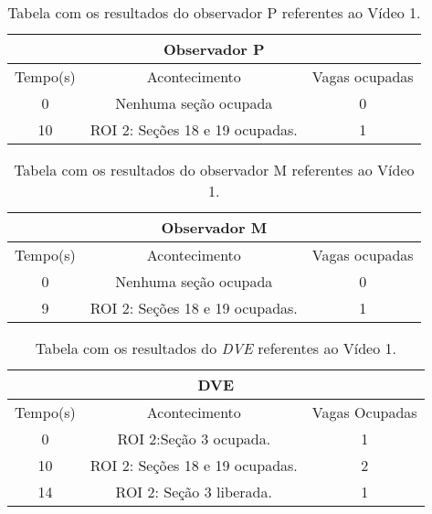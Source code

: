 \begin{table}[H]
\begin{center}
\begin{tabular}{|c||c||c|}
\hline
\multicolumn{3}{|c|}{Observador P}  \\ \hline \hline
Tempo(s) & Acontecimento & Vagas ocupadas\\ \hline
0 & Nenhuma seção ocupada & 0 \\ \hline
10 & ROI 2: Seções 18 e 19 ocupadas. & 1 \\
\hline
\end{tabular}
\caption{Tabela com os resultados do observador P referentes ao Vídeo 1.}
\label{tab:video1F}
\end{center}
\end{table}

\begin{table}[H]
\begin{center}
\begin{tabular}{|c||c||c|}
\hline
\multicolumn{3}{|c|}{Observador M}  \\ \hline \hline
Tempo(s) & Acontecimento & Vagas ocupadas\\ \hline
0 & Nenhuma seção ocupada & 0 \\ \hline
9 & ROI 2: Seções 18 e 19 ocupadas. & 1 \\
\hline
\end{tabular}
\caption{Tabela com os resultados do observador M referentes ao Vídeo 1.}
\label{tab:video1M}
\end{center}
\end{table}

\begin{table}[H]
\begin{center}
\begin{tabular}{|c||c||c|}
\hline
\multicolumn{3}{|c|}{DVE}  \\ \hline \hline
Tempo(s) & Acontecimento & Vagas Ocupadas\\ \hline
0 & ROI 2:Seção 3 ocupada. & 1 \\ \hline
10 & ROI 2: Seções 18 e 19 ocupadas. & 2\\ \hline
14 & ROI 2: Seção 3 liberada. & 1\\
\hline
\end{tabular}
\caption{Tabela com os resultados do \textit{DVE} referentes ao Vídeo 1.}
\label{tab:video1P}
\end{center}
\end{table}

